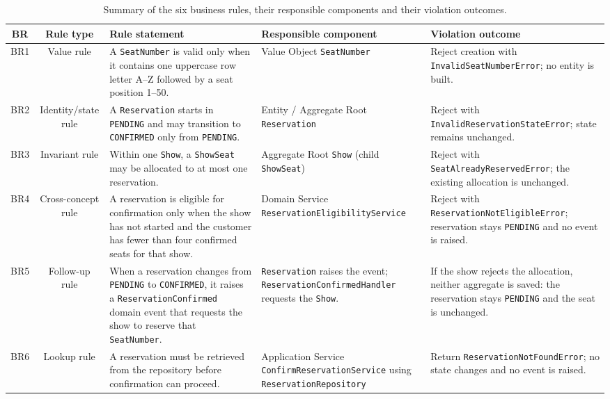 \documentclass[11pt,a4paper]{article}
\newcommand{\code}[1]{\texttt{#1}}
\begin{document}
\begin{table}[h]
  \centering
  \scriptsize
  \begin{tabularx}{\textwidth}{@{}c c X X X@{}}%
    \toprule
    \textbf{BR} & \textbf{Rule type} & \textbf{Rule statement} &
    \textbf{Responsible component} & \textbf{Violation outcome} \\
    \midrule
    BR1 & Value rule &
      A \code{SeatNumber} is valid only when it contains one uppercase row
      letter A--Z followed by a seat position 1--50. &
      Value Object \code{SeatNumber} & Reject creation with
      \code{InvalidSeatNumberError}; no entity is built. \\
    BR2 & Identity/state rule &
      A \code{Reservation} starts in \code{PENDING} and may transition to
      \code{CONFIRMED} only from \code{PENDING}. &
      Entity / Aggregate Root \code{Reservation} & Reject with
      \code{InvalidReservationStateError}; state remains unchanged. \\
    BR3 & Invariant rule &
      Within one \code{Show}, a \code{ShowSeat} may be allocated to at most one
      reservation. &
      Aggregate Root \code{Show} (child \code{ShowSeat}) & Reject with
      \code{SeatAlreadyReservedError}; the existing allocation is unchanged. \\
    BR4 & Cross-concept rule &
      A reservation is eligible for confirmation only when the show has not
      started and the customer has fewer than four confirmed seats for that
      show. &
      Domain Service \code{ReservationEligibilityService} & Reject with
      \code{ReservationNotEligibleError}; reservation stays \code{PENDING} and no
      event is raised. \\
    BR5 & Follow-up rule &
      When a reservation changes from \code{PENDING} to \code{CONFIRMED}, it
      raises a \code{ReservationConfirmed} domain event that requests the show
      to reserve that \code{SeatNumber}. &
      \code{Reservation} raises the event; \code{ReservationConfirmedHandler}
      requests the \code{Show}. & If the show rejects the allocation, neither
      aggregate is saved: the reservation stays \code{PENDING} and the seat is
      unchanged. \\
    BR6 & Lookup rule &
      A reservation must be retrieved from the repository before confirmation
      can proceed. &
      Application Service \code{ConfirmReservationService} using
      \code{ReservationRepository} & Return \code{ReservationNotFoundError}; no
      state changes and no event is raised. \\
    \bottomrule
  \end{tabularx}
  \caption{Summary of the six business rules, their responsible components and
    their violation outcomes.}
  \label{tab:rules}
\end{table}
\end{document}
